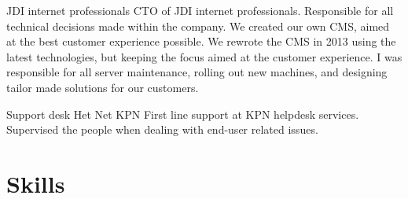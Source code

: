 \documentclass[11pt,a4paper]{moderncv}
\begin{document}
\vspace*{0.2\baselineskip}
{JDI internet professionals}
{}
{}
{}
{
CTO of JDI internet professionals. Responsible for all technical decisions
made within the company.
We created our own CMS, aimed at the best customer experience possible. We
rewrote the CMS in 2013 using the latest technologies, but keeping the focus
aimed at the customer experience.
I was responsible for all server maintenance, rolling out new machines,
and designing tailor made solutions for our customers.
}

\vspace*{0.2\baselineskip}
{Support desk Het Net}
{KPN}
{}
{}
{
First line support at KPN helpdesk services. Supervised the people when dealing
with end-user related issues.
}

\section{Skills}



\end{document}
